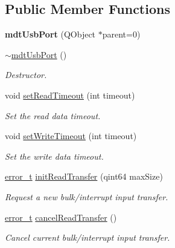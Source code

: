 \subsection*{Public Member Functions}
\begin{DoxyCompactItemize}
\item 
\hypertarget{classmdt_usb_port_a311650f4b2d29b6f16336c8777196d1c}{
{\bfseries mdtUsbPort} (QObject $\ast$parent=0)}
\label{classmdt_usb_port_a311650f4b2d29b6f16336c8777196d1c}

\item 
\hypertarget{classmdt_usb_port_afa9f1942ca4ae384887441e01b362c16}{
\hyperlink{classmdt_usb_port_afa9f1942ca4ae384887441e01b362c16}{$\sim$mdtUsbPort} ()}
\label{classmdt_usb_port_afa9f1942ca4ae384887441e01b362c16}

\begin{DoxyCompactList}\small\item\em Destructor. \end{DoxyCompactList}\item 
void \hyperlink{classmdt_usb_port_a44ed5024a81a573b5196b8f64c42cd6a}{setReadTimeout} (int timeout)
\begin{DoxyCompactList}\small\item\em Set the read data timeout. \end{DoxyCompactList}\item 
void \hyperlink{classmdt_usb_port_a592af88bd7e7f45dd80df0ecab375ace}{setWriteTimeout} (int timeout)
\begin{DoxyCompactList}\small\item\em Set the write data timeout. \end{DoxyCompactList}\item 
\hyperlink{classmdt_abstract_port_ad4121bb930c95887e77f8bafa065a85e}{error\_\-t} \hyperlink{classmdt_usb_port_a5e380852b8726f71e8558c86cba5bd1f}{initReadTransfer} (qint64 maxSize)
\begin{DoxyCompactList}\small\item\em Request a new bulk/interrupt input transfer. \end{DoxyCompactList}\item 
\hyperlink{classmdt_abstract_port_ad4121bb930c95887e77f8bafa065a85e}{error\_\-t} \hyperlink{classmdt_usb_port_a3570b708f9f51408e4bbf2f61cc8c881}{cancelReadTransfer} ()
\begin{DoxyCompactList}\small\item\em Cancel current bulk/interrupt input transfer. \end{DoxyCompactList}\item 

\end{DoxyCompactItemize}
